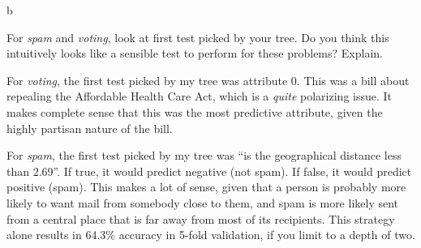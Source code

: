 \documentclass[fleqn]{homework}
\begin{document}
  \begin{problem}{b}
    \begin{question}
      For \textit{spam} and \textit{voting}, look at first test picked by your
      tree. Do you think this intuitively looks like a sensible test to perform
      for these problems?  Explain.
    \end{question}

    For \textit{voting}, the first test picked by my tree was attribute 0.  This
    was a bill about repealing the Affordable Health Care Act, which is a
    \textit{quite} polarizing issue.  It makes complete sense that this was the
    most predictive attribute, given the highly partisan nature of the bill.

    For \textit{spam}, the first test picked by my tree was ``is the
    geographical distance less than 2.69''.  If true, it would predict negative
    (not spam).  If false, it would predict positive (spam).  This makes a lot
    of sense, given that a person is probably more likely to want mail from
    somebody close to them, and spam is more likely sent from a central place
    that is far away from most of its recipients.  This strategy alone results
    in 64.3\% accuracy in 5-fold validation, if you limit to a depth of two.
  \end{problem}
\end{document}
